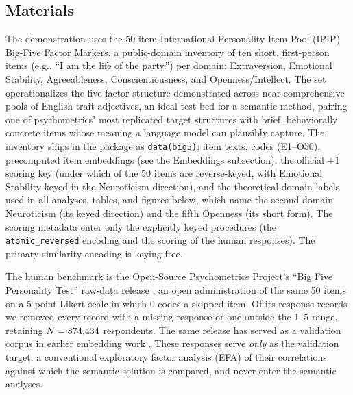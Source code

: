 \subsection{Materials}

The demonstration uses the 50-item International Personality Item Pool (IPIP) Big-Five Factor Markers, a public-domain inventory of ten short, first-person items (e.g., ``I am the life of the party.'') per domain: Extraversion, Emotional Stability, Agreeableness, Conscientiousness, and Openness/Intellect. The set operationalizes the five-factor structure \citet{goldberg-1990} demonstrated across near-comprehensive pools of English trait adjectives, an ideal test bed for a semantic method, pairing one of psychometrics' most replicated target structures with brief, behaviorally concrete items whose meaning a language model can plausibly capture. The inventory ships in the package as \texttt{data(big5)}: item texts, codes (E1--O50), precomputed item embeddings (see the Embeddings subsection), the official $\pm 1$ scoring key (under which \valNRev{} of the 50 items are reverse-keyed, with Emotional Stability keyed in the Neuroticism direction), and the theoretical domain labels used in all analyses, tables, and figures below, which name the second domain Neuroticism (its keyed direction) and the fifth Openness (its short form). The scoring metadata enter only the explicitly keyed procedures (the \texttt{atomic\_reversed} encoding and the scoring of the human responses). The primary similarity encoding is keying-free.

The human benchmark is the Open-Source Psychometrics Project's ``Big Five Personality Test'' raw-data release \citep{openpsychometrics-2018}, an open administration of the same 50 items on a 5-point Likert scale in which 0 codes a skipped item. Of its \valNHumanRaw{} response records we removed every record with a missing response or one outside the 1--5 range, retaining $N = 874{,}434$ respondents. The same release has served as a validation corpus in earlier embedding work \citep{wulff-mata-2025,jung-seo-2025}. These responses serve \emph{only} as the validation target, a conventional exploratory factor analysis (EFA) of their correlations against which the semantic solution is compared, and never enter the semantic analyses.
